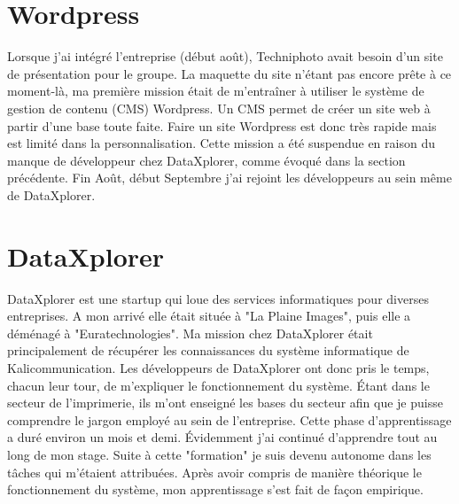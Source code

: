 
\section{Wordpress}
Lorsque j'ai intégré l'entreprise (début août), Techniphoto avait besoin d'un site de présentation pour le groupe. La maquette du site n'étant pas encore prête à ce moment-là, ma première mission était de m'entraîner à utiliser le système de gestion de contenu (CMS) Wordpress. Un CMS permet de créer un site web à partir d'une base toute faite. Faire un site Wordpress est donc très rapide mais est limité dans la personnalisation.\newline
Cette mission a été suspendue en raison du manque de développeur chez DataXplorer, comme évoqué dans la section précédente. Fin Août, début Septembre j'ai rejoint les développeurs au sein même de DataXplorer.

\section{DataXplorer}
DataXplorer est une startup qui loue des services informatiques pour diverses entreprises. A mon arrivé elle était située à "La Plaine Images", puis elle a déménagé à "Euratechnologies". Ma mission chez DataXplorer était principalement de récupérer les connaissances du système informatique de Kalicommunication. Les développeurs de DataXplorer ont donc pris le temps, chacun leur tour, de m'expliquer le fonctionnement du système. Étant dans le secteur de l'imprimerie, ils m'ont enseigné les bases du secteur afin que je puisse comprendre le jargon employé au sein de l'entreprise. Cette phase d'apprentissage a duré environ un mois et demi. Évidemment j'ai continué d'apprendre tout au long de mon stage. Suite à cette "formation" je suis devenu autonome dans les tâches qui m'étaient attribuées.\newline
Après avoir compris de manière théorique le fonctionnement du système, mon apprentissage s'est fait de façon empirique.
